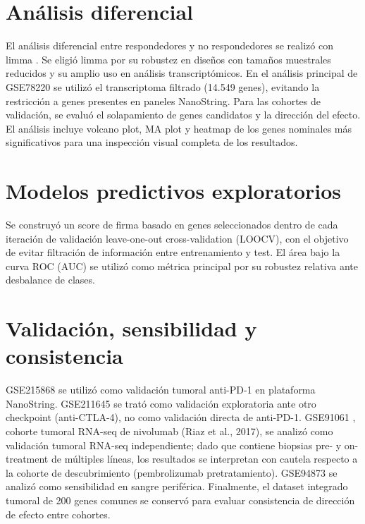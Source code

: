 \section{Análisis diferencial}

El análisis diferencial entre respondedores y no respondedores se realizó con limma \cite{Smyth2004, Ritchie2015}. Se eligió limma por su robustez en diseños con tamaños muestrales reducidos y su amplio uso en análisis transcriptómicos. En el análisis principal de GSE78220 \cite{GSE78220} se utilizó el transcriptoma filtrado (14.549 genes), evitando la restricción a genes presentes en paneles NanoString. Para las cohortes de validación, se evaluó el solapamiento de genes candidatos y la dirección del efecto. El análisis incluye volcano plot, MA plot y heatmap de los genes nominales más significativos para una inspección visual completa de los resultados.

\section{Modelos predictivos exploratorios}

Se construyó un score de firma basado en genes seleccionados dentro de cada iteración de validación leave-one-out cross-validation (LOOCV), con el objetivo de evitar filtración de información entre entrenamiento y test. El área bajo la curva ROC (AUC) se utilizó como métrica principal por su robustez relativa ante desbalance de clases.

\section{Validación, sensibilidad y consistencia}

GSE215868 \cite{GSE215868} se utilizó como validación tumoral anti-PD-1 en plataforma NanoString. GSE211645 \cite{GSE211645} se trató como validación exploratoria ante otro checkpoint (anti-CTLA-4), no como validación directa de anti-PD-1. GSE91061 \cite{GSE91061,Riaz2017}, cohorte tumoral RNA-seq de nivolumab (Riaz et al., 2017), se analizó como validación tumoral RNA-seq independiente; dado que contiene biopsias pre- y on-treatment de múltiples líneas, los resultados se interpretan con cautela respecto a la cohorte de descubrimiento (pembrolizumab pretratamiento). GSE94873 \cite{GSE94873,Friedlander2017} se analizó como sensibilidad en sangre periférica. Finalmente, el dataset integrado tumoral de 200 genes comunes se conservó para evaluar consistencia de dirección de efecto entre cohortes.

